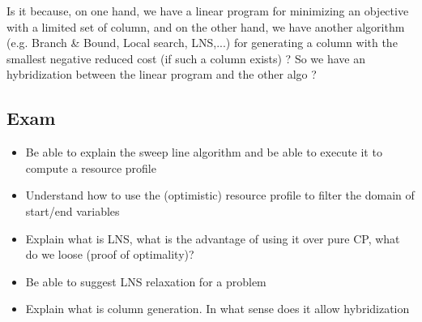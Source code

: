 Is it because, on one hand, we have a linear program for minimizing an
objective with a limited set of column, and on the other hand, we have
another algorithm (e.g. Branch \& Bound, Local search, LNS,...) for
generating a column with the smallest negative reduced cost (if such a
column exists) ?
So we have an hybridization between the linear program and the other
algo ?


\subsection{Exam}
\begin{itemize}
    \item  Be able to explain the sweep line algorithm and be
        able to execute it to compute a resource profile
    \item  Understand how to use the (optimistic) resource profile
        to filter the domain of start/end variables
    \item  Explain what is LNS, what is the advantage of using it
        over pure CP, what do we loose (proof of optimality)?
    \item  Be able to suggest LNS relaxation for a problem
    \item  Explain what is column generation. In what sense does
        it allow hybridization
\end{itemize}



